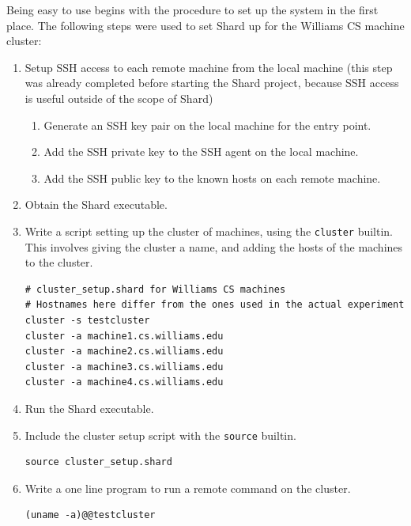 \documentclass[twoside]{report}
\begin{document}
Being easy to use begins with the procedure to set up the system in the first place.
The following steps were used to set Shard up for the Williams CS machine cluster:
\begin{enumerate}
  \item Setup SSH access to each remote machine from the local machine (this step was already completed before starting the Shard project, because SSH access is useful outside of the scope of Shard)
        \begin{enumerate}
          \item Generate an SSH key pair on the local machine for the entry point.
          \item Add the SSH private key to the SSH agent on the local machine.
          \item Add the SSH public key to the known hosts on each remote machine.
        \end{enumerate}
  \item Obtain the Shard executable.
  \item Write a script setting up the cluster of machines, using the \texttt{cluster} builtin. This involves giving the cluster a name, and adding the hosts of the machines to the cluster.
        \begin{lstlisting}[language=Shard]
# cluster_setup.shard for Williams CS machines
# Hostnames here differ from the ones used in the actual experiment
cluster -s testcluster
cluster -a machine1.cs.williams.edu
cluster -a machine2.cs.williams.edu
cluster -a machine3.cs.williams.edu
cluster -a machine4.cs.williams.edu
\end{lstlisting}
  \item Run the Shard executable.
  \item Include the cluster setup script with the \texttt{source} builtin.
        \begin{lstlisting}[language=Shard]
source cluster_setup.shard
\end{lstlisting}
  \item Write a one line program to run a remote command on the cluster.
        \begin{lstlisting}[language=Shard]
(uname -a)@@testcluster
\end{lstlisting}
\end{enumerate}
\end{document}
